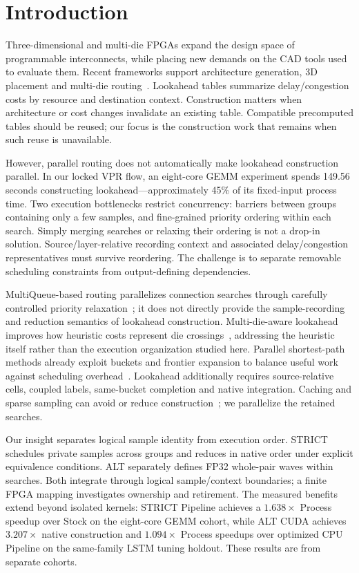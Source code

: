 \section{Introduction}
Three-dimensional and multi-die FPGAs expand the design space of programmable interconnects, while placing new demands on the CAD tools used to evaluate them. Recent frameworks support architecture generation, 3D placement and multi-die routing~\cite{lazagna,flatland,multidie}. Lookahead tables summarize delay/congestion costs by resource and destination context. Construction matters when architecture or cost changes invalidate an existing table. Compatible precomputed tables should be reused; our focus is the construction work that remains when such reuse is unavailable.

However, parallel routing does not automatically make lookahead construction parallel. In our locked VPR flow, an eight-core GEMM experiment spends 149.56 seconds constructing lookahead---approximately 45\% of its fixed-input process time. Two execution bottlenecks restrict concurrency: barriers between groups containing only a few samples, and fine-grained priority ordering within each search. Simply merging searches or relaxing their ordering is not a drop-in solution. Source/layer-relative recording context and associated delay/congestion representatives must survive reordering. The challenge is to separate removable scheduling constraints from output-defining dependencies.

MultiQueue-based routing parallelizes connection searches through carefully controlled priority relaxation~\cite{multiqueue}; it does not directly provide the sample-recording and reduction semantics of lookahead construction. Multi-die-aware lookahead improves how heuristic costs represent die crossings~\cite{multidie}, addressing the heuristic itself rather than the execution organization studied here. Parallel shortest-path methods already exploit buckets and frontier expansion to balance useful work against scheduling overhead~\cite{delta,gpu_sssp}. Lookahead additionally requires source-relative cells, coupled labels, same-bucket completion and native integration. Caching and sparse sampling can avoid or reduce construction~\cite{vproptions}; we parallelize the retained searches.

Our insight separates logical sample identity from execution order. STRICT schedules private samples across groups and reduces in native order under explicit equivalence conditions. ALT separately defines FP32 whole-pair waves within searches. Both integrate through logical sample/context boundaries; a finite FPGA mapping investigates ownership and retirement. The measured benefits extend beyond isolated kernels: STRICT Pipeline achieves a $1.638\times$ Process speedup over Stock on the eight-core GEMM cohort, while ALT CUDA achieves $3.207\times$ native construction and $1.094\times$ Process speedups over optimized CPU Pipeline on the same-family LSTM tuning holdout. These results are from separate cohorts.

